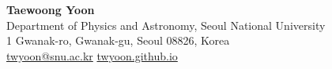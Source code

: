 \begin{center}
{\sffamily\bfseries\LARGE\color{accent} Taewoong Yoon} \\[0.55em]
{\small Department of Physics and Astronomy, Seoul National University} \\
{\small 1 Gwanak-ro, Gwanak-gu, Seoul 08826, Korea} \\[0.35em]
{\small \href{mailto:twyoon@snu.ac.kr}{twyoon@snu.ac.kr}
\enspace\textperiodcentered\enspace \href{https://twyoon.github.io/}{twyoon.github.io}}
\end{center}
\vspace{0.4em}
